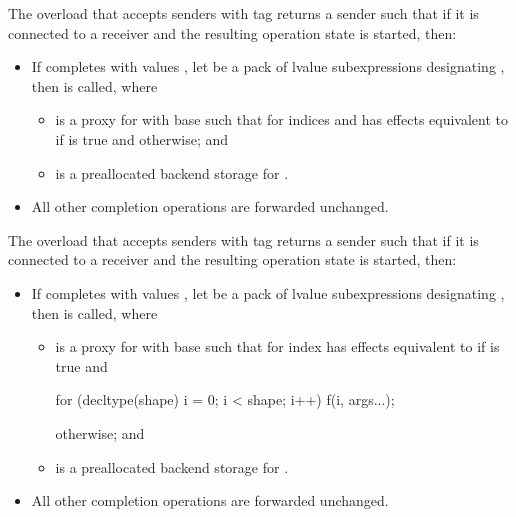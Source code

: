 \pnum
The  overload
that accepts senders with tag 
returns a sender such that if it is connected to a receiver  and
the resulting operation state is started, then:
\begin{itemize}
\item
If  completes with values ,
let  be a pack of lvalue subexpressions designating ,
then  is called, where
\begin{itemize}
\item
{} is a proxy for 
with base 
such that  for indices  and 
has effects equivalent to
 if  is true and
 otherwise; and
\item
{} is a preallocated backend storage for .
\end{itemize}
\item
All other completion operations are forwarded unchanged.
\end{itemize}

\pnum
The  overload
that accepts senders with tag 
returns a sender such that if it is connected to a receiver  and
the resulting operation state is started, then:
\begin{itemize}
\item
If  completes with values ,
let  be a pack of lvalue subexpressions designating ,
then  is called, where
\begin{itemize}
\item
{} is a proxy for 
with base 
such that  for index 
has effects equivalent to
 if  is true and
\begin{codeblock}
for (decltype(shape) i = 0; i < shape; i++) { f(i, args...); }
\end{codeblock}
otherwise; and
\item
{} is a preallocated backend storage for .
\end{itemize}
\item
All other completion operations are forwarded unchanged.
\end{itemize}

